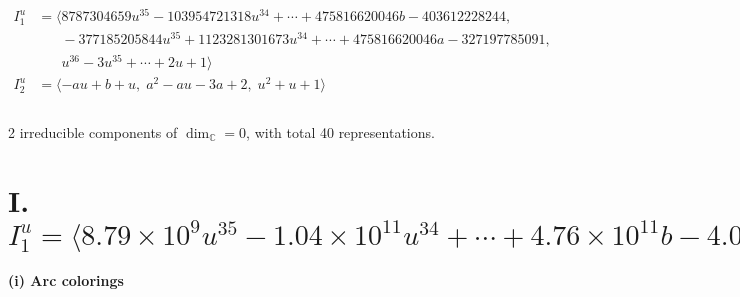 \documentclass[1p]{elsarticle_modified}
\theoremstyle{definition}
\begin{document}
\begin{align*}
I^u_{1}&=\langle 
8787304659 u^{35}-103954721318 u^{34}+\cdots+475816620046 b-403612228244,\\
\phantom{I^u_{1}}&\phantom{= \langle  }-377185205844 u^{35}+1123281301673 u^{34}+\cdots+475816620046 a-327197785091,\\
\phantom{I^u_{1}}&\phantom{= \langle  }u^{36}-3 u^{35}+\cdots+2 u+1\rangle \\
I^u_{2}&=\langle 
- a u+b+u,\;a^2- a u-3 a+2,\;u^2+u+1\rangle \\
\\
\end{align*}
\raggedright * 2 irreducible components of $\dim_{\mathbb{C}}=0$, with total 40 representations.\\
\newpage
\renewcommand{\arraystretch}{1}
\centering \section*{I. $I^u_{1}= \langle 8.79\times10^{9} u^{35}-1.04\times10^{11} u^{34}+\cdots+4.76\times10^{11} b-4.04\times10^{11},\;-3.77\times10^{11} u^{35}+1.12\times10^{12} u^{34}+\cdots+4.76\times10^{11} a-3.27\times10^{11},\;u^{36}-3 u^{35}+\cdots+2 u+1 \rangle$}
\flushleft \textbf{(i) Arc colorings}\\
\end{document}
